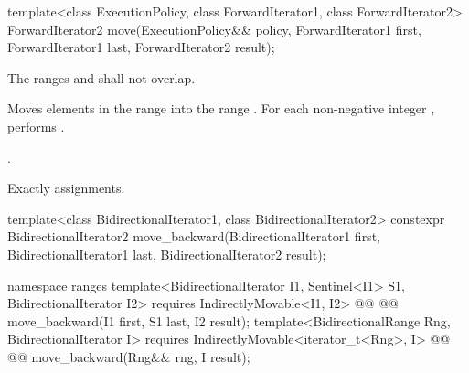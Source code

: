 %
\begin{itemdecl}
template<class ExecutionPolicy, class ForwardIterator1, class ForwardIterator2>
  ForwardIterator2 move(ExecutionPolicy&& policy,
                        ForwardIterator1 first, ForwardIterator1 last,
                        ForwardIterator2 result);
\end{itemdecl}

\begin{itemdescr}
\pnum
\requires The ranges  and
 shall not overlap.

\pnum
\effects Moves elements in the range  into
the range .
For each non-negative integer ,
performs .

\pnum
\returns {}.

\pnum
\complexity Exactly  assignments.
\end{itemdescr}

%
\begin{itemdecl}
template<class BidirectionalIterator1, class BidirectionalIterator2>
  constexpr BidirectionalIterator2
    move_backward(BidirectionalIterator1 first, BidirectionalIterator1 last,
                  BidirectionalIterator2 result);
\end{itemdecl}
\begin{addedblock}
%
\begin{itemdecl}
namespace ranges {
  template<BidirectionalIterator I1, Sentinel<I1> S1, BidirectionalIterator I2>
    requires IndirectlyMovable<I1, I2>
    @@
    @@
      move_backward(I1 first, S1 last, I2 result);
  template<BidirectionalRange Rng, BidirectionalIterator I>
    requires IndirectlyMovable<iterator_t<Rng>, I>
    @@
    @@
      move_backward(Rng&& rng, I result);
}
\end{itemdecl}
\end{addedblock}

